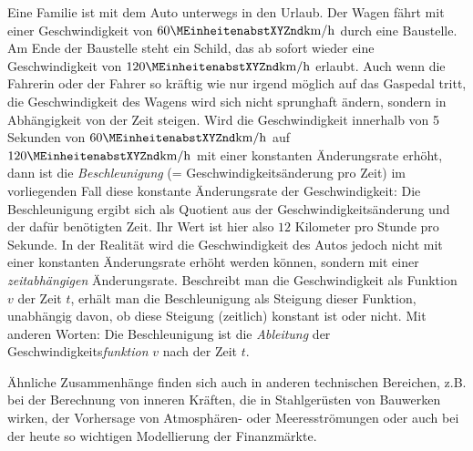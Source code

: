 

\Mtikzexternalize
{}





\begin{MSectionStart}

\MModstartBox
\end{MSectionStart}


\begin{MIntro}
Eine Familie ist mit dem Auto unterwegs in den Urlaub. Der Wagen fährt mit einer Geschwindigkeit von $60\MEinheit{km}/\MEinheit[]{h}$ durch eine Baustelle.
Am Ende der Baustelle steht ein Schild, das ab sofort wieder eine Geschwindigkeit von $120\MEinheit{km}/\MEinheit[]{h}$ erlaubt.
Auch wenn die Fahrerin oder der Fahrer so kräftig wie nur irgend möglich auf das Gaspedal tritt, die Geschwindigkeit des Wagens wird sich nicht sprunghaft ändern,
sondern in Abhängigkeit von der Zeit steigen. Wird die Geschwindigkeit innerhalb von 5 Sekunden von $60\MEinheit{km}/\MEinheit[]{h}$ auf $120\MEinheit{km}/\MEinheit[]{h}$
mit einer konstanten Änderungsrate erhöht, dann ist die \emph{Beschleunigung} (= Geschwindigkeitsänderung pro Zeit) im vorliegenden Fall diese konstante Änderungsrate der Geschwindigkeit:
Die Beschleunigung ergibt sich als Quotient aus der Geschwindigkeitsänderung und der dafür benötigten Zeit. Ihr Wert ist hier also $12$ Kilometer pro Stunde pro Sekunde.
In der Realität wird die Geschwindigkeit des Autos jedoch nicht mit einer konstanten Änderungsrate erhöht werden können, sondern mit einer 
\emph{zeitabhängigen} Änderungsrate. Beschreibt man die Geschwindigkeit als Funktion $v$ der Zeit $t$, erhält man die Beschleunigung als Steigung dieser Funktion,
unabhängig davon, ob diese Steigung (zeitlich) konstant ist oder nicht. Mit anderen Worten: Die Beschleunigung ist die \emph{Ableitung} der Geschwindigkeits\emph{funktion} $v$
nach der Zeit $t$.

Ähnliche Zusammenhänge finden sich auch in anderen technischen Bereichen, z.B. bei der Berechnung von inneren Kräften, die in Stahlgerüsten von Bauwerken wirken,
der Vorhersage von Atmosphären- oder Meeresströmungen oder auch bei der heute so wichtigen Modellierung der Finanzmärkte.


\end{MIntro}
